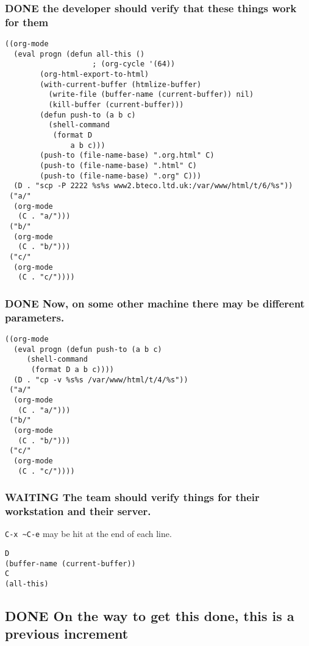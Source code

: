 \documentclass[11pt]{article}
\begin{document}
\subsubsection*{{\bfseries\sffamily DONE} the developer should verify that these things work for \textbf{them}}
\label{sec:org7ea1407}

\begin{verbatim}
((org-mode
  (eval progn (defun all-this ()
					; (org-cycle '(64))
		(org-html-export-to-html)
		(with-current-buffer (htmlize-buffer)
		  (write-file (buffer-name (current-buffer)) nil)
		  (kill-buffer (current-buffer)))
		(defun push-to (a b c)
		  (shell-command
		   (format D
			   a b c)))
		(push-to (file-name-base) ".org.html" C)
		(push-to (file-name-base) ".html" C)
		(push-to (file-name-base) ".org" C)))
  (D . "scp -P 2222 %s%s www2.bteco.ltd.uk:/var/www/html/t/6/%s"))
 ("a/"
  (org-mode
   (C . "a/")))
 ("b/"
  (org-mode
   (C . "b/")))
 ("c/"
  (org-mode
   (C . "c/"))))
\end{verbatim}

\subsubsection*{{\bfseries\sffamily DONE} Now, on some other machine there may be different parameters.}
\label{sec:orge6ffd80}

\begin{verbatim}
((org-mode
  (eval progn (defun push-to (a b c)
     (shell-command
      (format D a b c))))
  (D . "cp -v %s%s /var/www/html/t/4/%s"))
 ("a/"
  (org-mode
   (C . "a/")))
 ("b/"
  (org-mode
   (C . "b/")))
 ("c/"
  (org-mode
   (C . "c/"))))
\end{verbatim}

\subsubsection*{{\bfseries\sffamily WAITING} The team should verify things for \textbf{their} workstation and \textbf{their} server.}
\label{sec:orgc9ea4a8}

\texttt{C-x \textasciitilde{}C-e} may be hit at the end of each line.

\begin{verbatim}
D
(buffer-name (current-buffer))
C
(all-this)
\end{verbatim}

\subsection*{{\bfseries\sffamily DONE} On the way to get this done, this is a previous increment}
\label{sec:org787b4cf}
\end{document}
